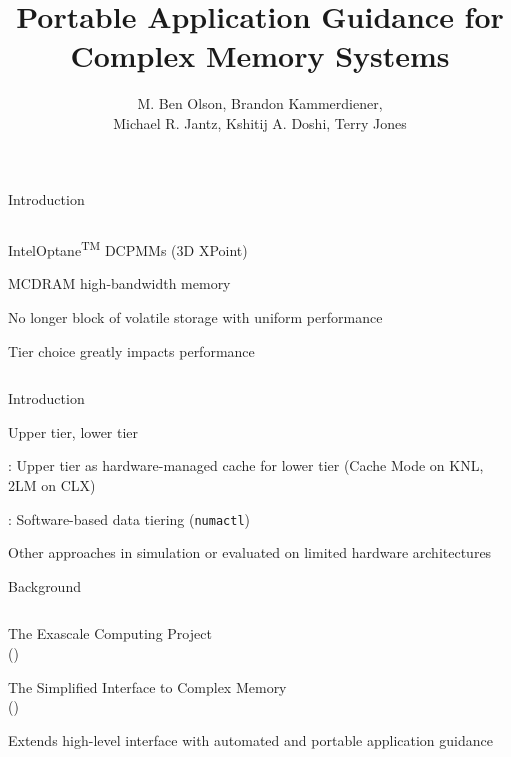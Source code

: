 \documentclass[final,hyperref={pdfpagelabels=false}]{beamer}
\title{Portable Application Guidance for Complex Memory Systems}
\author{M. Ben Olson, Brandon Kammerdiener,\\Michael R. Jantz, Kshitij A. Doshi, Terry Jones}
\begin{document}
\begin{frame}
  \maketitle
\end{frame}

\begin{frame}{Introduction}
\begin{minipage}{\paperwidth}
\begin{columns}[T,onlytextwidth]%
%
  \begin{customlist}{0em}{0em}
    \item Intel\textregistered Optane\textsuperscript{TM} DCPMMs (3D XPoint)
    \item MCDRAM high-bandwidth memory
    \item No longer block of volatile storage with uniform performance
    \item Tier choice greatly impacts performance
  \end{customlist}
%
  \resizebox{.85\textwidth}{!}{%
    
  }
\end{columns}
\end{minipage}
\end{frame}

\begin{frame}{Introduction}
  \begin{customlist}{0em}{0em}
    \item Upper tier, lower tier
    \item {}: Upper
      tier as hardware-managed cache for lower tier (Cache Mode on KNL, 2LM on CLX)
    \item {}:
      Software-based data tiering (\texttt{numactl})
    \item Other approaches in simulation or evaluated on limited hardware architectures
  \end{customlist}
\end{frame}

\begin{frame}{Background}
  \begin{columns}[T,onlytextwidth]%
    \resizebox{.9\textwidth}{!}{%
      
    }
    \begin{customlist}{0em}{0em}
      \item The Exascale Computing Project\\()
      \item The Simplified Interface to Complex Memory\\()
      \item Extends high-level interface with automated and portable application
        guidance
    \end{customlist}
  \end{columns}
\end{frame}
\end{document}
